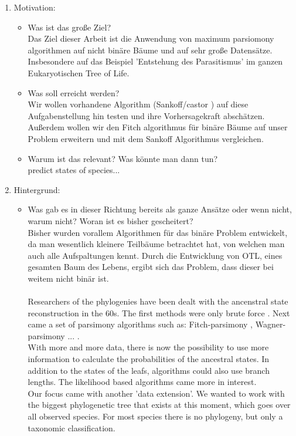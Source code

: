   \begin{enumerate}
    \item Motivation:
      \begin{itemize}
        \item Was ist das große Ziel? \\
          Das Ziel dieser Arbeit ist die Anwendung von maximum parsiomony algorithmen auf nicht 
          binäre Bäume und auf sehr große Datensätze. Insbesondere auf das Beispiel 'Entstehung des 
          Parasitismus' im ganzen Eukaryotischen Tree of Life.
        \item Was soll erreicht werden? \\
          Wir wollen vorhandene Algorithm (Sankoff/castor \cite{Louca2017}) auf diese Aufgabenstellung hin testen 
          und ihre Vorhersagekraft abschätzen. Außerdem wollen wir den Fitch algorithmus für binäre 
          Bäume auf unser Problem erweitern und mit dem Sankoff Algorithmus vergleichen.
        \item Warum ist das relevant? Was könnte man dann tun?\\
          predict states of species... \\
          \todo{!!!}
      \end{itemize}
    \item Hintergrund:
      \begin{itemize}
        \item Was gab es in dieser Richtung bereits als ganze Ansätze oder wenn nicht, warum nicht?
          Woran ist es bisher gescheitert? \\
          Bisher wurden vorallem Algorithmen für das binäre Problem entwickelt, da man wesentlich 
            kleinere Teilbäume betrachtet hat, von welchen man auch alle Aufspaltungen kennt. Durch 
            die Entwicklung von OTL, eines gesamten Baum des Lebens, ergibt sich das Problem, dass 
            dieser bei weitem nicht binär ist. \\ \\
  Researchers of the phylogenies have been dealt with the ancenstral state reconstruction in the 
    60s. The first methods were only brute force . 
    Next came a set of parsimony algorithms such as: Fitch-parsimony \cite{Fitch1971}, 
    Wagner-parsimony \cite{Swofford1987} ... . \\
    With more and more data, there is now the possibility to use more information to calculate the 
    probabilities of the ancestral states. In addition to the states of the leafs, algorithms could 
    also use branch lengths. The likelihood based algorithms came more in interest. \\
    Our focus came with another 'data extension'. We wanted to work with the biggest phylogenetic tree 
    that exists at this moment, which goes over all observed species. For most  species 
    there is no phylogeny, but only a taxonomic classification.
  

\end{itemize}
\end{enumerate}
